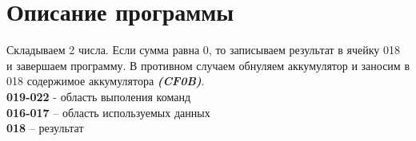 \documentclass[a4paper,14pt]{article}
\begin{document}
\section{Описание программы}
Складываем 2 числа. Если сумма равна 0, то записываем результат в ячейку 018 и завершаем программу. В противном случаем обнуляем аккумулятор и заносим в 018 содержимое аккумулятора \textit{\textbf{(CF0B)}}.\\

\noindent
\textbf{019-022} - область выполения команд\\
\textbf{016-017} – область используемых данных\\
\textbf{018} – результат
\end{document}
